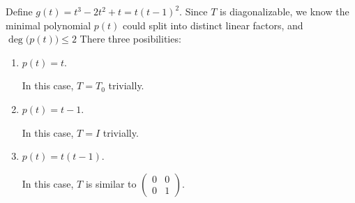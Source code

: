 \begin{Exercise}
	\begin{solution}
		Define $g(t) = t^3-2t^2+t = t(t-1)^2$.
		Since $T$ is diagonalizable, we know the minimal polynomial $p(t)$ could split into distinct linear factors, and $\deg\big(p(t)\big) \leq 2$ 
		There three posibilities:
		\begin{enumerate}
			\item $p(t) = t$.
			
			In this case, $T = T_0$ trivially.
			
			\item $p(t) = t-1$.
			
			In this case, $T = I$ trivially.
			
			\item $p(t) = t(t-1)$.
			
			In this case, $T$ is similar to $\begin{pmatrix}
			0 & 0 \\
			0 & 1
			\end{pmatrix}$.
		\end{enumerate}
	\end{solution}
\end{Exercise}